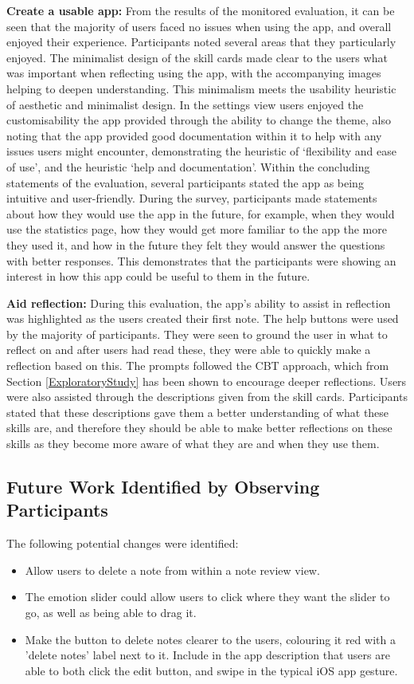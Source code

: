 \documentclass{l4proj}
\begin{document}
\textbf{Create a usable app:} From the results of the monitored evaluation, it can be seen that the majority of users faced no issues when using the app, and overall enjoyed their experience. Participants noted several areas that they particularly enjoyed. The minimalist design of the skill cards made clear to the users what was important when reflecting using the app, with the accompanying images helping to deepen understanding. This minimalism meets the usability heuristic of aesthetic and minimalist design. In the settings view users enjoyed the customisability the app provided through the ability to change the theme, also noting that the app provided good documentation within it to help with any issues users might encounter, demonstrating the heuristic of ‘flexibility and ease of use’, and the heuristic ‘help and documentation’. Within the concluding statements of the evaluation, several participants stated the app as being intuitive and user-friendly. During the survey, participants made statements about how they would use the app in the future, for example, when they would use the statistics page, how they would get more familiar to the app the more they used it, and how in the future they felt they would answer the questions with better responses. This demonstrates that the participants were showing an interest in how this app could be useful to them in the future.

\textbf{Aid reflection:} During this evaluation, the app's ability to assist in reflection was highlighted as the users created their first note. The help buttons were used by the majority of participants. They were seen to ground the user in what to reflect on and after users had read these, they were able to quickly make a reflection based on this. The prompts followed the CBT approach, which from Section \ref{ExploratoryStudy} has been shown to encourage deeper reflections. Users were also assisted through the descriptions given from the skill cards. Participants stated that these descriptions gave them a better understanding of what these skills are, and therefore they should be able to make better reflections on these skills as they become more aware of what they are and when they use them.

\subsection{Future Work Identified by Observing Participants}

The following potential changes were identified:
\begin{itemize}
    \item Allow users to delete a note from within a note review view.
    \item The emotion slider could allow users to click where they want the slider to go, as well as being able to drag it.
    \item Make the button to delete notes clearer to the users, colouring it red with a 'delete notes' label next to it. Include in the app description that users are able to both click the edit button, and swipe in the typical iOS app gesture.
\end{itemize}
\end{document}
